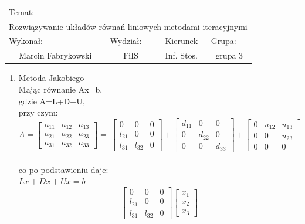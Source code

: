 \documentclass[12pt,a4paper]{article}
\begin{document}
 
\large
\begin{tabular}{|c|c|c|c|}
\hline
\multicolumn{4}{|l|}{Temat:}\\
\multicolumn{4}{|c|}{Rozwiązywanie układów równań liniowych metodami iteracyjnymi}\\
\hline
\multicolumn{1}{|l}{Wykonał:}&\multicolumn{1}{|l}{Wydział:}&\multicolumn{1}{|c}{Kierunek}&\multicolumn{1}{|l|}{Grupa:}\\
Marcin Fabrykowski&FiIS&Inf. Stos.&grupa 3\\
\hline
\end{tabular}
\normalsize
\vspace{2cm}
\begin{enumerate}
\item Metoda Jakobiego\\
Mając równanie Ax=b,\\
gdzie A=L+D+U,\\
przy czym:\\
\begin{equation}
A=\begin{bmatrix}
a_{11}&a_{12}&a_{13}\\
a_{21}&a_{22}&a_{23}\\
a_{31}&a_{32}&a_{33}
\end{bmatrix}=\
\begin{bmatrix}
0&0&0\\
l_{21}&0&0\\
l_{31}&l_{32}&0
\end{bmatrix}+
\begin{bmatrix}
d_{11}&0&0\\
0&d_{22}&0\\
0&0&d_{33}
\end{bmatrix}+
\begin{bmatrix}
0&u_{12}&u_{13}\\
0&0&u_{23}\\
0&0&0
\end{bmatrix}
\end{equation}\\
co po podstawieniu daje:\\
$Lx+Dx+Ux=b$\\
\begin{equation}
\begin{bmatrix}
0&0&0\\
l_{21}&0&0\\
l_{31}&l_{32}&0
\end{bmatrix}
\begin{bmatrix}
x_1\\x_2\\x_3

\end{bmatrix}
\end{equation}
\end{enumerate}
\end{document}
